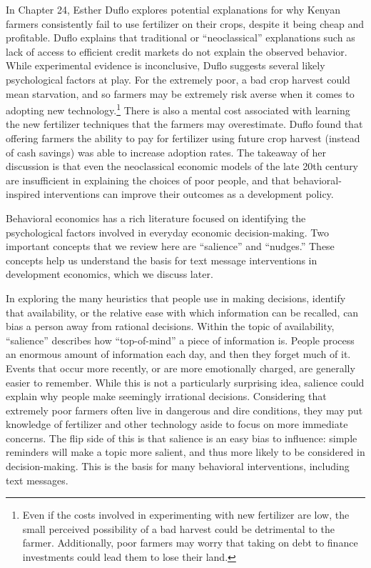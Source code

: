 \documentclass[12pt]{article}
\begin{document}
In \textcite{banerjee_understanding_2006} Chapter 24, Esther Duflo explores potential explanations for why Kenyan farmers consistently fail to use fertilizer on their crops, despite it being cheap and profitable. Duflo explains that traditional or ``neoclassical'' explanations such as lack of access to efficient credit markets do not explain the observed behavior. While experimental evidence is inconclusive, Duflo suggests several likely psychological factors at play. For the extremely poor, a bad crop harvest could mean starvation, and so farmers may be extremely risk averse when it comes to adopting new technology.\footnote{Even if the costs involved in experimenting with new fertilizer are low, the small perceived possibility of a bad harvest could be detrimental to the farmer. Additionally, poor farmers may worry that taking on debt to finance investments could lead them to lose their land.} There is also a mental cost associated with learning the new fertilizer techniques that the farmers may overestimate. Duflo found that offering farmers the ability to pay for fertilizer using future crop harvest (instead of cash savings) was able to increase adoption rates. The takeaway of her discussion is that even the neoclassical economic models of the late 20th century are insufficient in explaining the choices of poor people, and that behavioral-inspired interventions can improve their outcomes as a development policy. 

Behavioral economics has a rich literature focused on identifying the psychological factors involved in everyday economic decision-making. Two important concepts that we review here are ``salience'' and ``nudges.'' These concepts help us understand the basis for text message interventions in development economics, which we discuss later.

In exploring the many heuristics that people use in making decisions, \textcite{tversky_judgment_1974} identify that availability, or the relative ease with which information can be recalled, can bias a person away from rational decisions. Within the topic of availability, ``salience'' describes how ``top-of-mind'' a piece of information is. People process an enormous amount of information each day, and then they forget much of it. Events that occur more recently, or are more emotionally charged, are generally easier to remember. While this is not a particularly surprising idea, salience could explain why people make seemingly irrational decisions. Considering that extremely poor farmers often live in dangerous and dire conditions, they may put knowledge of fertilizer and other technology aside to focus on more immediate concerns. The flip side of this is that salience is an easy bias to influence: simple reminders will make a topic more salient, and thus more likely to be considered in decision-making. This is the basis for many behavioral interventions, including text messages.
\end{document}
